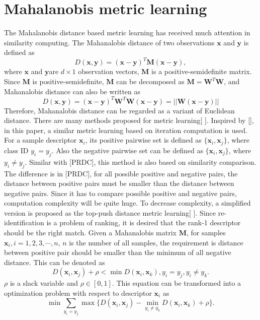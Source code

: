 \documentclass[conference,compsoc]{IEEEtran}
\begin{document}
\section{Mahalanobis metric learning}
The Mahalanobis distance based metric learning has received much attention in similarity computing. The Mahanalobis distance of two observations $\bm{x} $ and $\bm{y}$ is defined as
\begin{equation}
D(\bm{x},\bm{y}) = (\bm{x} - \bm{y})^T\bm{M}(\bm{x} - \bm{y}), 
\end{equation}
where $\bm{x}$ and $\bm{y} $are $d\times1$ observation vectors, $\bm{M}$ is a positive-semidefinite matrix. Since $\bm{M}$ is positive-semidefinite, $\bm{M}$ can be decomposed as $\bm{M} = \bm{W}^T\bm{W}$, and Mahanalobis distance can also be written as 
\begin{equation}
D(\bm{x},\bm{y}) = (\bm{x} - \bm{y})^T\bm{W}^T\bm{W}(\bm{x} - \bm{y})= ||\bm{W}(\bm{x} - \bm{y})||
\end{equation}
 Therefore, Mahanalobis distance can be regarded as a variant of Euclidean distance. There are many methods proposed for metric learning[ ]. Inspired by [], in this paper, a similar metric learning based on iteration computation is used. For a  sample descriptor $\bm{x}_i$,  its positive pairwise set is defined as $\{\bm{x}_i,\bm{x}_j\}$, where class ID $y_i = y_j$. Also the negative pairwise set can be defined as $\{\bm{x}_i,\bm{x}_j\}$, where $y_i \ne y_j$. Similar with [PRDC], this method is also based on similarity comparison. The difference is in [PRDC], for all possible positive and negative pairs, the distance between positive pairs must be smaller than the distance between negative pairs. Since it has to compare possible positive and negative pairs, computation complexity will be quite huge.  To decrease complexity, a simplified version is proposed as the top-push distance metric learning[ ].  Since re-identification is a problem of ranking, it is desired that the rank-1 descriptor should be the right match. Given a Mahanalobis matrix $\bm{M}$, for samples $\bm{x}_i, i = 1,2,3,\cdots,n$, $n$ is the number of all samples, the requirement is distance between positive pair should be smaller than the minimum of all negative distance. This can be denoted as 
 \begin{equation}
 D(\bm{x}_i,\bm{x}_j) + \rho < \min D(\bm{x}_i,\bm{x}_k), y_i = y_j, y_i\ne y_k.
 \end{equation}
 $\rho$ is a slack variable and $\rho \in [0,1]$. This equation can be transformed into a optimization problem with respect to descriptor $\bm{x}_i$ as
 \begin{equation}
 \min \sum_{y_i = y_j} \max \{D(\bm{x}_i,\bm{x}_j) -  \min_{ y_i\ne y_k} D(\bm{x}_i,\bm{x}_k)  + \rho \}.
 \end{equation}
 
\end{document}
